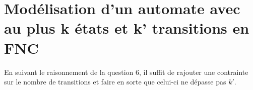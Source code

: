 \documentclass[a4paper, 12pt]{extarticle}
\begin{document}
\section{Modélisation d'un automate avec au plus k états et k' transitions en FNC}
En suivant le raisonnement de la question 6, il suffit de rajouter une contrainte sur le nombre de transitions et faire en sorte que
celui-ci ne dépasse pas $k'$.


\end{document}
